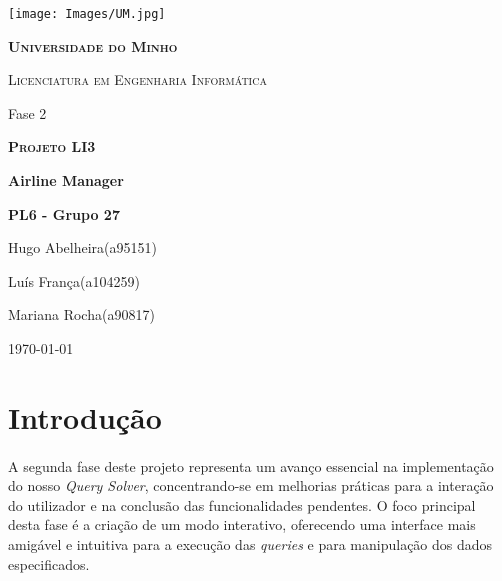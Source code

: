 \documentclass{article}
\begin{document}
\begin{center}
    \begin{minipage}{0.83\linewidth}
        \centering
        \texttt{[image: Images/UM.jpg]}\par\vspace{0.5cm}
        {\scshape\textbf{Universidade do Minho}} \par
        {\scshape Licenciatura em Engenharia Informática} \par
        \vspace{3cm}
        {\LARGE Fase 2\\} \par
        {\scshape\LARGE \textbf{Projeto LI3}\\} \par
        \vspace{1.0cm}
        {\LARGE \textbf{Airline Manager}} \par
        \vspace{2cm}
        {\LARGE\textbf {PL6 - Grupo 27}} \par
        \vspace{0.1cm}
        {\LARGE Hugo Abelheira(a95151)\par Luís França(a104259)\par Mariana Rocha(a90817) \par}
        
        \vspace{5cm}
        {\large \today\par}
        
    \end{minipage}
\end{center}
\newpage
\tableofcontents
\listoffigures

\newpage
\section{Introdução}
\paragraph{}A segunda fase deste projeto representa um avanço essencial na implementação do nosso \textit{Query Solver}, concentrando-se em melhorias práticas para a interação do utilizador e na conclusão das funcionalidades pendentes. O foco principal desta fase é a criação de um modo interativo, oferecendo uma interface mais amigável e intuitiva para a execução das \textit{queries} e para manipulação dos dados especificados.
\vspace{-0.3cm}
\end{document}
